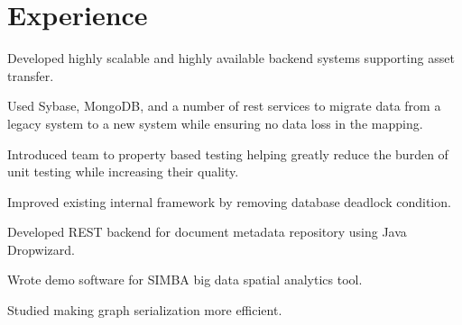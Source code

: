 \documentclass[letterpaper]{deedy-resume} %
\begin{document}
\hfill
%
%
\begin{minipage}[t]{0.64\textwidth} %


\section{Experience}

\vspace{\topsep} %
\begin{tightitemize}
	\item Developed highly scalable and highly available backend systems supporting asset transfer.
	\item Used Sybase, MongoDB, and a number of rest services to migrate data from a legacy system to a new system while ensuring no data loss in the mapping.
	\item Introduced team to property based testing helping greatly reduce the burden of unit testing while increasing their quality.
\end{tightitemize}

\begin{tightitemize}
\item Improved existing internal framework by removing database deadlock condition.
\item Developed REST backend for document metadata repository using Java Dropwizard.
\end{tightitemize}


\begin{tightitemize}
\item Wrote demo software for SIMBA big data spatial analytics tool.
\item Studied making graph serialization more efficient.
\end{tightitemize}


\end{minipage}
\end{document}
